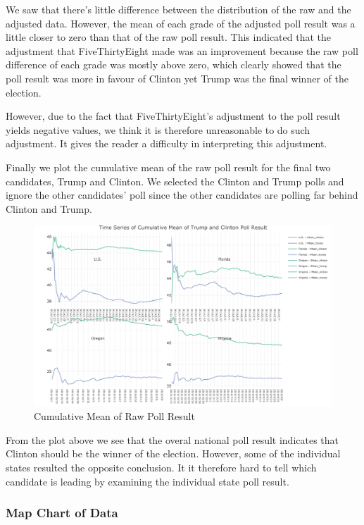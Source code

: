 \documentclass[
  12pt,
]{article}
\begin{document}
We saw that there's little difference between the distribution of the
raw and the adjusted data. However, the mean of each grade of the
adjusted poll result was a little closer to zero than that of the raw
poll result. This indicated that the adjustment that FiveThirtyEight
made was an improvement because the raw poll difference of each grade
was mostly above zero, which clearly showed that the poll result was
more in favour of Clinton yet Trump was the final winner of the
election.

However, due to the fact that FiveThirtyEight's adjustment to the poll
result yields negative values, we think it is therefore unreasonable to
do such adjustment. It gives the reader a difficulty in interpreting
this adjustment.

Finally we plot the cumulative mean of the raw poll result for the final
two candidates, Trump and Clinton. We selected the Clinton and Trump
polls and ignore the other candidates' poll since the other candidates
are polling far behind Clinton and Trump.

\begin{figure}
\centering
\includegraphics{./Figures/cMeanchart.png}
\caption{Cumulative Mean of Raw Poll Result}
\end{figure}

From the plot above we see that the overal national poll result
indicates that Clinton should be the winner of the election. However,
some of the individual states resulted the opposite conclusion. It it
therefore hard to tell which candidate is leading by examining the
individual state poll result.

\hypertarget{map-chart-of-data}{%
\subsubsection{Map Chart of Data}\label{map-chart-of-data}}
\end{document}
